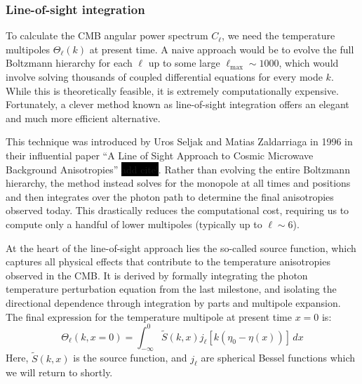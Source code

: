 \documentclass{aa}
\numberwithin{equation}{section}
\numberwithin{table}{section}
\numberwithin{figure}{section}
\begin{document}







\subsubsection{Line-of-sight integration}
\color{Plum}
To calculate the CMB angular power spectrum $C_\ell$, we need the temperature multipoles $\Theta_\ell(k)$ at present time. A naive approach would be to evolve the full Boltzmann hierarchy for each $\ell$ up to some large $\ell_{\text{max}} \sim 1000$, which would involve solving thousands of coupled differential equations for every mode $k$. While this is theoretically feasible, it is extremely computationally expensive. Fortunately, a clever method known as line-of-sight integration offers an elegant and much more efficient alternative.

This technique was introduced by Uros Seljak and Matias Zaldarriaga in 1996 in their influential paper ``A Line of Sight Approach to Cosmic Microwave Background Anisotropies'' \colorbox{black}{add cite!}. Rather than evolving the entire Boltzmann hierarchy, the method instead solves for the monopole at all times and positions and then integrates over the photon path to determine the final anisotropies observed today. This drastically reduces the computational cost, requiring us to compute only a handful of lower multipoles (typically up to $\ell \sim 6$).

At the heart of the line-of-sight approach lies the so-called source function, which captures all physical effects that contribute to the temperature anisotropies observed in the CMB. It is derived by formally integrating the photon temperature perturbation equation from the last milestone, and isolating the directional dependence through integration by parts and multipole expansion. The final expression for the temperature multipole at present time $x = 0$ is:
\begin{equation}
\Theta_\ell(k, x=0) = \int_{-\infty}^{0} \tilde{S}(k, x) j_\ell[k(\eta_0 - \eta(x))]\, dx
\end{equation}
Here, $\tilde{S}(k, x)$ is the source function, and $j_\ell$ are spherical Bessel functions which we will return to shortly.
\end{document}
